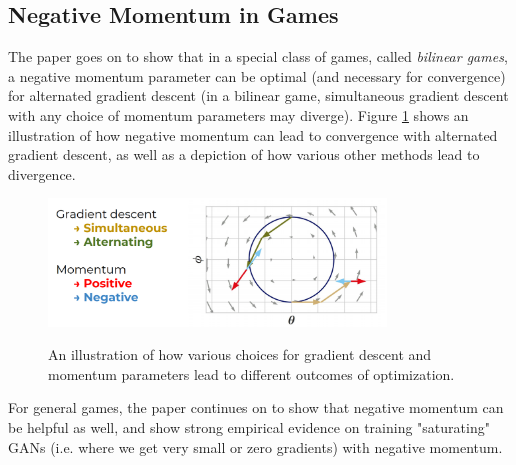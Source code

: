 \documentclass{article}
\begin{document}
\subsection{Negative Momentum in Games}

The paper goes on to show that in a special class of games, called \textit{bilinear games}, a negative momentum parameter can be optimal (and necessary for convergence) for alternated gradient descent (in a bilinear game, simultaneous gradient descent with any choice of momentum parameters may diverge). Figure \ref{fig:bilinearconv} shows an illustration of how negative momentum can lead to convergence with alternated gradient descent, as well as a depiction of how various other methods lead to divergence. 

\begin{figure}[h!]
    \centering
    \includegraphics[width=0.8\textwidth]{bilinearconv.png}
    \label{fig:bilinearconv}
    \caption{An illustration of how various choices for gradient descent and momentum parameters lead to different outcomes of optimization.}
\end{figure}


For general games, the paper continues on to show that negative momentum can be helpful as well, and show strong empirical evidence on training "saturating" GANs (i.e. where we get very small or zero gradients) with negative momentum.

%
%




\end{document}
